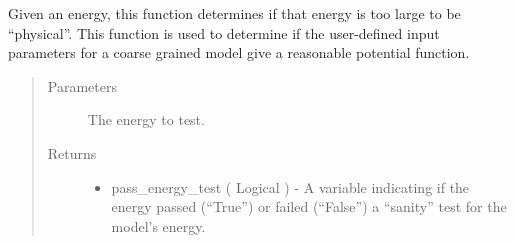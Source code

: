 \documentclass[letterpaper,12pt,english,openany,oneside]{sphinxmanual}
\begin{document}

\begin{fulllineitems}
\label{\detokenize{ensembles:ensembles.ens_build.test_energy}}
Given an energy, this function determines if that energy is too large to be “physical”.  This function is used to determine if the user-defined input parameters for a coarse grained model give a reasonable potential function.
\begin{quote}\begin{description}
\item[{Parameters}] \leavevmode
{} \textendash{} The energy to test.

\item[{Returns}] \leavevmode
\begin{itemize}
\item {} 
pass\_energy\_test ( Logical ) - A variable indicating if the energy passed (“True”) or failed (“False”) a “sanity” test for the model’s energy.

\end{itemize}


\end{description}\end{quote}

\end{fulllineitems}

\end{document}
